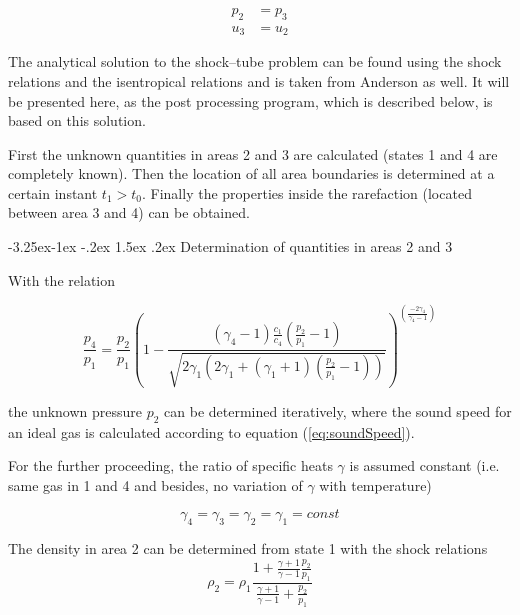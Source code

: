 \documentclass{report}
\makeatletter
\renewcommand\paragraph{\@startsection{paragraph}{4}{\z@}%
  {-3.25ex\@plus -1ex \@minus -.2ex}%
  {1.5ex \@plus .2ex}%
  {\normalfont\normalsize\bfseries}}
\makeatother
\begin{document}
\begin{equation}
\begin{split}
\label{eq:condCD}
p_2&=p_3\\
u_3&=u_2
\end{split}
\end{equation}

The analytical solution to the shock--tube problem can be found using the shock relations and the isentropical relations and is taken from Anderson \cite{Anderson2002} as well. 
It will be presented here, as the post processing program, which is described below, is based on this solution.

First the unknown quantities in areas 2 and 3 are calculated (states 1 and 4 are completely known). Then the location of all area boundaries is determined at a certain instant $t_1>t_0$. Finally the properties inside the rarefaction (located between area 3 and 4) can be obtained.

\paragraph{Determination of quantities in areas 2 and 3}

With the relation

\begin{equation}
 \frac{p_4}{p_1} = \frac{p_2}{p_1}  \left(1-\frac{(\gamma_4-1)\frac{c_1}{c_4}\left(\frac{p_2}{p_1}-1\right)}{\sqrt{2\gamma_1\left(2 \gamma_1+(\gamma_1+1)\left(\frac{p_2}{p_1}-1\right)\right)}}\right)^{\left(\frac{-2 \gamma_4}{\gamma_4-1}\right)}
\end{equation}

 the unknown pressure $p_2$ can be determined iteratively, where the sound speed for an ideal gas is calculated according to equation (\ref{eq:soundSpeed}). 

For the further proceeding, the ratio of specific heats $\gamma$ is assumed constant (i.e. same gas in 1 and 4 and besides, no variation of $\gamma$ with temperature)

\begin{equation}
 \gamma_4= \gamma_3= \gamma_2= \gamma_1=const
\end{equation}

The density in area 2 can be determined from state 1 with the shock relations 
\begin{equation}
 \rho_2=\rho_1\frac{1+\frac{\gamma+1}{\gamma-1}\frac{p_2}{p_1}}{\frac{\gamma+1}{\gamma-1}+\frac{p_2}{p_1}}
\end{equation}
\end{document}

